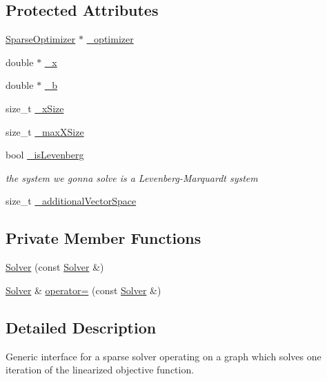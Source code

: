 \subsection*{Protected Attributes}
\begin{DoxyCompactItemize}
\item 
\mbox{\hyperlink{classg2o_1_1_sparse_optimizer}{Sparse\+Optimizer}} $\ast$ \mbox{\hyperlink{classg2o_1_1_solver_aff3275985d996329df15070348c21292}{\+\_\+optimizer}}
\item 
double $\ast$ \mbox{\hyperlink{classg2o_1_1_solver_a94ee5e303a754f4ff338a7b032c214ae}{\+\_\+x}}
\item 
double $\ast$ \mbox{\hyperlink{classg2o_1_1_solver_a52c92c9bf5db0da3322da3a02dbeb245}{\+\_\+b}}
\item 
size\+\_\+t \mbox{\hyperlink{classg2o_1_1_solver_abcf7731347f14915bd9ba963021ea830}{\+\_\+x\+Size}}
\item 
size\+\_\+t \mbox{\hyperlink{classg2o_1_1_solver_a263003f9053537f92d5d019ce5c53771}{\+\_\+max\+X\+Size}}
\item 
bool \mbox{\hyperlink{classg2o_1_1_solver_a8b7f6d4e00e3734f5ed9bd3dfac201a6}{\+\_\+is\+Levenberg}}
\begin{DoxyCompactList}\small\item\em the system we gonna solve is a Levenberg-\/\+Marquardt system \end{DoxyCompactList}\item 
size\+\_\+t \mbox{\hyperlink{classg2o_1_1_solver_a6a1492959487c279747a8f3097a5f04e}{\+\_\+additional\+Vector\+Space}}
\end{DoxyCompactItemize}
\subsection*{Private Member Functions}
\begin{DoxyCompactItemize}
\item 
\mbox{\hyperlink{classg2o_1_1_solver_a040c384f90e39504853a29648a71bc25}{Solver}} (const \mbox{\hyperlink{classg2o_1_1_solver}{Solver}} \&)
\item 
\mbox{\hyperlink{classg2o_1_1_solver}{Solver}} \& \mbox{\hyperlink{classg2o_1_1_solver_a19a6b5b126e7bef1c99dff89567f2eff}{operator=}} (const \mbox{\hyperlink{classg2o_1_1_solver}{Solver}} \&)
\end{DoxyCompactItemize}


\subsection{Detailed Description}
Generic interface for a sparse solver operating on a graph which solves one iteration of the linearized objective function. 

